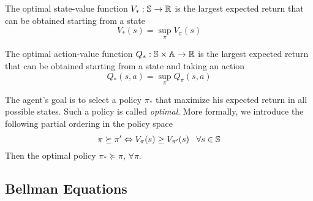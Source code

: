\begin{definition}
	The optimal state-value function $V_*: \S \to \R$ is the largest expected 
	return that can be obtained starting from a state
	\begin{equation}
		V_*(s) = \sup_\pi V_\pi(s)
	\end{equation}
\end{definition}
\begin{definition}
	The optimal action-value function $Q_*: \S \times \A \to \R$ is the largest
	expected return that can be obtained starting from a state and taking an
	action
	\begin{equation}
		Q_*(s,a) = \sup_\pi Q_\pi(s,a)
	\end{equation}
\end{definition}
The agent's goal is to select a policy $\pi_*$ that maximize his expected return
in all possible states. Such a policy is called \emph{optimal}. More formally,
we introduce the following partial ordering in the policy space
\begin{equation}
	\pi \succeq \pi' \Leftrightarrow V_\pi(s) \geq V_{\pi'}(s) \;\;\; \forall s \in \S
\end{equation}
Then the optimal policy $\pi_* \succeq \pi$, $\forall \pi$.

\subsection{Bellman Equations}


